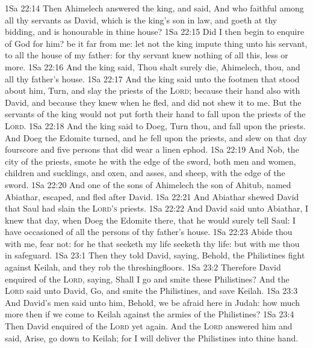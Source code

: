 \vs 1Sa 22:14 Then Ahimelech answered the king, and said, And who  faithful among all thy servants as David, which is the king's son in law, and goeth at thy bidding, and is honourable in thine house?
\vs 1Sa 22:15 Did I then begin to enquire of God for him? be it far from me: let not the king impute  thing unto his servant,  to all the house of my father: for thy servant knew nothing of all this, less or more.
\vs 1Sa 22:16 And the king said, Thou shalt surely die, Ahimelech, thou, and all thy father's house.
\vs 1Sa 22:17 And the king said unto the footmen that stood about him, Turn, and slay the priests of the \textsc{Lord}; because their hand also  with David, and because they knew when he fled, and did not shew it to me. But the servants of the king would not put forth their hand to fall upon the priests of the \textsc{Lord}.
\vs 1Sa 22:18 And the king said to Doeg, Turn thou, and fall upon the priests. And Doeg the Edomite turned, and he fell upon the priests, and slew on that day fourscore and five persons that did wear a linen ephod.
\vs 1Sa 22:19 And Nob, the city of the priests, smote he with the edge of the sword, both men and women, children and sucklings, and oxen, and asses, and sheep, with the edge of the sword.
\vs 1Sa 22:20 And one of the sons of Ahimelech the son of Ahitub, named Abiathar, escaped, and fled after David.
\vs 1Sa 22:21 And Abiathar shewed David that Saul had slain the \textsc{Lord's} priests.
\vs 1Sa 22:22 And David said unto Abiathar, I knew  that day, when Doeg the Edomite  there, that he would surely tell Saul: I have occasioned  of all the persons of thy father's house.
\vs 1Sa 22:23 Abide thou with me, fear not: for he that seeketh my life seeketh thy life: but with me thou  in safeguard.
\vs 1Sa 23:1 Then they told David, saying, Behold, the Philistines fight against Keilah, and they rob the threshingfloors.
\vs 1Sa 23:2 Therefore David enquired of the \textsc{Lord}, saying, Shall I go and smite these Philistines? And the \textsc{Lord} said unto David, Go, and smite the Philistines, and save Keilah.
\vs 1Sa 23:3 And David's men said unto him, Behold, we be afraid here in Judah: how much more then if we come to Keilah against the armies of the Philistines?
\vs 1Sa 23:4 Then David enquired of the \textsc{Lord} yet again. And the \textsc{Lord} answered him and said, Arise, go down to Keilah; for I will deliver the Philistines into thine hand.

